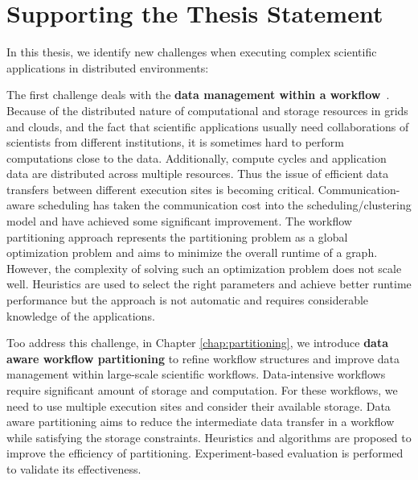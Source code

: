 \section{Supporting the Thesis Statement}

In this thesis, we identify new challenges when executing complex scientific applications in distributed environments:

The first challenge deals with the \textbf{data management within a workflow}~\cite{wang2013supporting, wang2012scimate, wang2014removing}. 
Because of the distributed nature of computational and storage resources in grids and clouds, and the fact that scientific applications usually need collaborations of scientists from different institutions, it is sometimes hard to perform computations close to the data. Additionally, compute cycles and application data are distributed across multiple resources. 
Thus the issue of efficient data transfers between different execution sites is becoming critical. 
Communication-aware scheduling \cite{Sonmez2006, Jones2004} has taken the communication cost into the scheduling/clustering model and have achieved some significant improvement. The workflow partitioning approach \cite{Hedayat2009, Yuan2010, Wieczorek2005,Rubing2005} represents the partitioning problem as a global optimization problem and aims to minimize the overall runtime of a graph. However, the complexity of solving such an optimization problem does not scale well. Heuristics \cite{Maheshwari2012, Callaghan2010} are used to select the right parameters and achieve better runtime performance but the approach is not automatic and requires considerable knowledge of the applications. 

Too address this challenge, in Chapter \ref{chap:partitioning}, we introduce \textbf{data aware workflow partitioning} to refine workflow structures and improve data management within large-scale scientific workflows. Data-intensive workflows require significant amount of storage and computation. For these workflows, we need to use multiple execution sites and consider their available storage. Data aware partitioning aims to reduce the intermediate data transfer in a workflow while satisfying the storage constraints. Heuristics and algorithms are proposed to improve the efficiency of partitioning. Experiment-based evaluation is performed to validate its effectiveness.  

